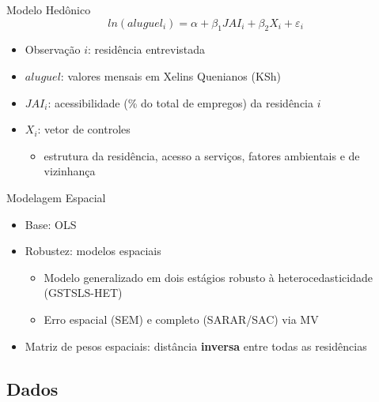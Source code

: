 \documentclass[
  ignorenonframetext,
  aspectratio=169]{beamer}
\providecommand{\tightlist}{%
  \setlength{\itemsep}{0pt}\setlength{\parskip}{0pt}}
\begin{document}
\begin{frame}{Modelo Hedônico}
\protect\hypertarget{modelo-heduxf4nico}{}
\begin{equation}
ln(aluguel_i) = \alpha + \beta_1 JAI_i + \beta_2 X_i + \varepsilon_i
\end{equation}

\begin{itemize}
\tightlist
\item
  Observação \(i\): residência entrevistada
\item
  \(aluguel\): valores mensais em Xelins Quenianos (KSh)
\item
  \(JAI_i\): acessibilidade (\% do total de empregos) da residência
  \(i\)
\item
  \(X_i\): vetor de controles

  \begin{itemize}
  \tightlist
  \item
    estrutura da residência, acesso a serviços, fatores ambientais e de
    vizinhança
  \end{itemize}
\end{itemize}
\end{frame}

\begin{frame}{Modelagem Espacial}
\protect\hypertarget{modelagem-espacial}{}
\begin{itemize}
\tightlist
\item
  Base: OLS
\item
  Robustez: modelos espaciais

  \begin{itemize}
  \tightlist
  \item
    Modelo generalizado em dois estágios robusto à heterocedasticidade
    (GSTSLS-HET)
  \item
    Erro espacial (SEM) e completo (SARAR/SAC) via MV
  \end{itemize}
\item
  Matriz de pesos espaciais: distância \textbf{inversa} entre todas as
  residências
\end{itemize}
\end{frame}

\hypertarget{dados}{%
\subsection{Dados}\label{dados}}
\end{document}
